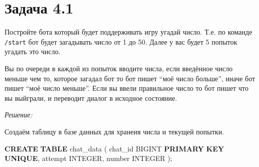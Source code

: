 \documentclass[
]{book}
\newenvironment{Shaded}{\begin{snugshade}}{\end{snugshade}}
\newcommand{\CommentTok}[1]{\textcolor[rgb]{0.56,0.35,0.01}{\textit{#1}}}
\newcommand{\DataTypeTok}[1]{\textcolor[rgb]{0.13,0.29,0.53}{#1}}
\newcommand{\FunctionTok}[1]{\textcolor[rgb]{0.00,0.00,0.00}{#1}}
\newcommand{\KeywordTok}[1]{\textcolor[rgb]{0.13,0.29,0.53}{\textbf{#1}}}
\newcommand{\NormalTok}[1]{#1}
\newcommand{\OtherTok}[1]{\textcolor[rgb]{0.56,0.35,0.01}{#1}}
\newcommand{\SpecialCharTok}[1]{\textcolor[rgb]{0.00,0.00,0.00}{#1}}
\newcommand{\StringTok}[1]{\textcolor[rgb]{0.31,0.60,0.02}{#1}}
\begin{document}
\begin{Shaded}
\end{Shaded}

\hypertarget{ux437ux430ux434ux430ux447ux430-4.1}{%
\section*{Задача 4.1}\label{ux437ux430ux434ux430ux447ux430-4.1}}

Постройте бота который будет поддерживать игру угадай число. Т.е. по команде \texttt{/start} бот будет загадывать число от 1 до 50. Далее у вас будет 5 попыток угадать это число.

Вы по очереди в каждой из попыток вводите числа, если введённое число меньше чем то, которое загадал бот то бот пишет ``моё число больше'', иначе бот пишет ``моё число меньше''. Если вы ввели правильное число то бот пишет что вы выйграли, и переводит диалог в исходное состояние.

\emph{Решение:}

Создаём таблицу в базе данных для хранеия числа и текущей попытки.

\begin{Shaded}
\begin{Highlighting}[]
\KeywordTok{CREATE} \KeywordTok{TABLE}\NormalTok{ chat\_data (}
\NormalTok{    chat\_id BIGINT  }\KeywordTok{PRIMARY} \KeywordTok{KEY}
                    \KeywordTok{UNIQUE}\NormalTok{,}
\NormalTok{    attempt    }\DataTypeTok{INTEGER}\NormalTok{,}
    \DataTypeTok{number}     \DataTypeTok{INTEGER}
\NormalTok{);}
\end{Highlighting}
\end{Shaded}
\end{document}
